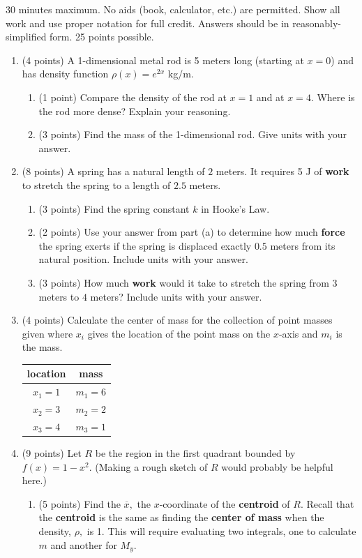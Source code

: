 \documentclass[12pt]{article}
\begin{document}
30 minutes maximum.  No aids (book, calculator, etc.) are permitted.  Show all work and use proper notation for full credit.  Answers should be in reasonably-simplified form.  25 points possible.

\begin{enumerate}
\item (4 points) A 1-dimensional metal rod is 5 meters long (starting at $x=0$) and has density function $\rho(x)=e^{2x}$ kg/m.
	\begin{enumerate}
	\item (1 point) Compare the density of the rod at $x=1$ and at $x=4$. Where is the rod more dense? Explain your reasoning.
	\vfill
	\item (3 points) Find the mass of the 1-dimensional rod. Give units with your answer.
	\vfill
	\end{enumerate}
\newpage
\item (8 points) A spring has a natural length of $2$ meters. It requires 5 J of \textbf{work} to stretch the spring to a length of $2.5$ meters. 
	\begin{enumerate}
	\item (3 points) Find the spring constant $k$ in Hooke's Law.
	\vfill
	
	\vfill
	\item (2 points) Use your answer from part (a) to determine how much \textbf{force} the spring exerts if the spring is displaced exactly $0.5$ meters from its natural position. Include units with your answer.
	\vfill
	\item (3 points) How much \textbf{work} would it take to stretch the spring from $3$ meters to $4$ meters? Include units with your answer.
	\vfill
	\vfill
	\end{enumerate}
\item (4 points) Calculate the center of mass for the collection of point masses given where $x_i$ gives the location of the point mass on the $x$-axis and $m_i$ is the mass. \\

\begin{tabular}{cc}
location&mass\\
\hline
$x_1=1$&$m_1=6$\\
$x_2=3$&$m_2=2$\\
$x_3=4$&$m_3=1$\\
\end{tabular}

\vspace{.3in}
\newpage
\item (9 points) Let $R$ be the region in the first quadrant bounded by $f(x)=1-x^2$. (Making a rough sketch of $R$ would probably be helpful here.)
	\begin{enumerate}
	\item (5 points) Find the $\overline{x},$ the $x$-coordinate of the \textbf{centroid} of $R.$ Recall that the \textbf{centroid} is the same as finding the \textbf{center of mass} when the density, $\rho,$ is 1. This will require evaluating two integrals, one to calculate $m$ and another for $M_y.$
	

\end{enumerate}
\end{enumerate}
\end{document}
